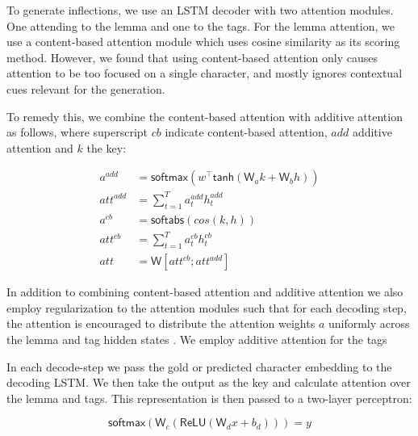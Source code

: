 \documentclass[11pt,a4paper]{article}
\newcommand\jp[1]{\textbf{JP: #1}}
\begin{document}
To generate inflections, we use an LSTM decoder with two attention
modules. One attending to the lemma and one to the tags. For the lemma
attention, we use a content-based attention module
\cite{graves2014neural, karunaratne2021robust} which uses cosine
similarity as its scoring method.  However, we found that using
content-based attention only causes attention to be too focused on a
single character, and mostly ignores contextual cues relevant for the
generation.

To remedy this, we combine the content-based attention with additive
attention as follows, where superscript $cb$ indicate content-based attention,
$add$ additive attention and $k$ the key:

\begin{align*}
	a^{add} & = \mathsf{softmax}(w^\top\mathsf{tanh}(\mathsf{W}_ak + \mathsf{W}_bh))\\
	att^{add} & = \sum_{t=1}^{T}a_t^{add}h_t^{add}\\
	a^{cb} & = \mathsf{softabs}(cos(k,h))\\
	att^{cb} & = \sum_{t=1}^{T}a_t^{cb}h_t^{cb}\\
	att & = \mathsf{W}[att^{cb}; att^{add}]
\end{align*}

In addition to combining content-based attention and additive
attention we also employ regularization to the attention modules such
that for each decoding step, the attention is encouraged to distribute
the attention weights $a$ uniformly across the lemma and tag hidden
states \cite{DBLP:conf/emnlp/AnastasopoulosN19,
DBLP:conf/naacl/CohnHVYDH16}. We employ additive attention for the tags

In each decode-step we pass the gold or predicted character embedding
to the decoding LSTM. We then take the output as the key and calculate
attention over the lemma and tags. This representation is then passed
to a two-layer perceptron:

\begin{equation*}
\mathsf{softmax}(\mathsf{W}_c(\mathsf{ReLU}(\mathsf{W}_dx+b_d))) = y
\end{equation*}
\end{document}
